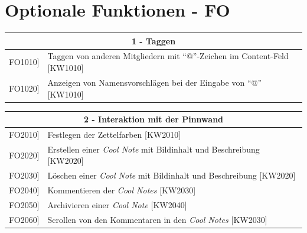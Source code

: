 \documentclass[a4paper]{scrreprt}
\begin{document}
    		\vspace{1cm}
    		\clearpage
    		
    		\section{Optionale Funktionen - FO}
    		
    		\begin{table}[h!]
    			\centering
    			\label{my-label}
    			\begin{tabular}{p{2cm}p{12cm}}
    				
    				\multicolumn{2}{c}{\textbf{1 - Taggen}} \\ \hline
    				\centering{[}FO1010{]} & Taggen von anderen Mitgliedern mit ``@”-Zeichen im Content-Feld {[}KW1010{]}\\
    				\centering{[}FO1020{]}& Anzeigen von Namensvorschlägen bei der Eingabe von ``@” {[}KW1010{]} \\
    				\hline
    			\end{tabular}
    		\end{table}
    		
    		\vspace{5mm}
    		
    		\begin{table}[h!]
    			\centering
    			\label{my-label}
    			\begin{tabular}{p{2cm}p{12cm}}
    				
    				\multicolumn{2}{c}{\textbf{2 - Interaktion mit der Pinnwand}} \\ \hline
    				\centering{[}FO2010{]} & Festlegen der Zettelfarben {[}KW2010{]}\\
    				\centering{[}FO2020{]}& Erstellen einer \textit{Cool Note} mit Bildinhalt und Beschreibung {[}KW2020{]}     \\
    				\centering{[}FO2030{]}& Löschen einer \textit{Cool Note} mit Bildinhalt und Beschreibung {[}KW2020{]}\\ 
    				\centering{[}FO2040{]}& Kommentieren der \textit{Cool Notes} {[}KW2030{]}\\ 
    				\centering{[}FO2050{]}& Archivieren einer \textit{Cool Note} {[}KW2040{]}\\ 
    				\centering{[}FO2060{]}& Scrollen von den Kommentaren in den \textit{Cool Notes} {[}KW2030{]}\\ 
    				\hline
    			\end{tabular}
    		\end{table}
    		
\end{document}
